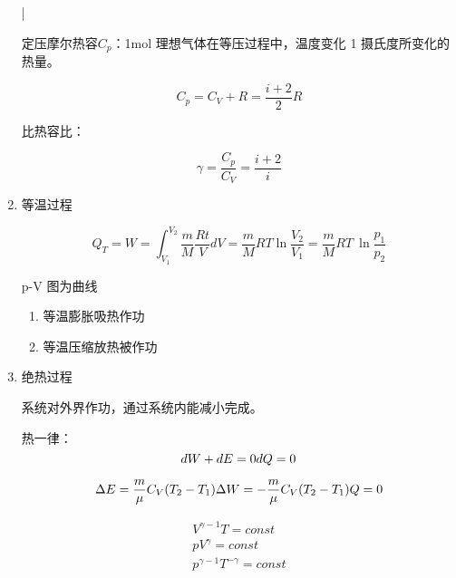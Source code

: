 \begin{enumerate}
          |

          定压摩尔热容$C_p$：1mol 理想气体在等压过程中，温度变化 1 摄氏度所变化的热量。

          \begin{equation}
              C_p=C_V+R=\frac{i+2}{2}R
          \end{equation}

          比热容比：

          \begin{equation}
              \gamma{}=\frac{C_p}{C_V}=\frac{i+2}{i}
          \end{equation}

    \item 等温过程

          \begin{equation}
              Q_T=W=\int_{V_1}^{V_2}{\frac{m}{M}\frac{Rt}{V}dV}=\frac{m}{M}RT\ln\frac{V_2}{V_1}=\frac{m}{M}RT~\ln{\frac{p_1}{p_2}}
          \end{equation}

          p-V 图为曲线

          \begin{enumerate}
              \item 等温膨胀吸热作功
              \item 等温压缩放热被作功
          \end{enumerate}

    \item 绝热过程

          系统对外界作功，通过系统内能减小完成。

          热一律：
          \begin{equation}
              dW+dE=0\\
              dQ=0
          \end{equation}

          \begin{equation}
              \Delta{E}=\frac{m}{\mu}C_V(T_2-T_1)\\
              \Delta{W}=-\frac{m}{\mu}C_V(T_2-T_1)\\
              Q=0
          \end{equation}

          \begin{equation}
              \begin{aligned}
                  V^{\gamma{}-1}T=\mathit{const} \\
                  pV^{\gamma}=\mathit{const}     \\
                  p^{\gamma{}-1}T^{-\gamma}=\mathit{const}
              \end{aligned}
          \end{equation}


\end{enumerate}
